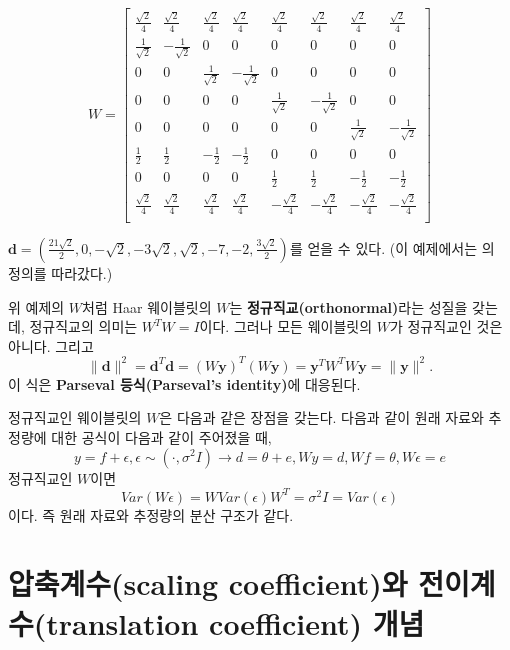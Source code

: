 \documentclass[b5paper,]{scrbook}
\theoremstyle{plain}
\theoremstyle{definition}
\numberwithin{equation}{section}
\begin{document}
\[
W =
\begin{bmatrix}
\frac{\sqrt{2}}{4} & \frac{\sqrt{2}}{4} & \frac{\sqrt{2}}{4} & \frac{\sqrt{2}}{4} & \frac{\sqrt{2}}{4} & \frac{\sqrt{2}}{4} & \frac{\sqrt{2}}{4} & \frac{\sqrt{2}}{4}\\
\frac{1}{\sqrt{2}} & -\frac{1}{\sqrt{2}} & 0 & 0 & 0 & 0 & 0 & 0\\
 0 & 0 & \frac{1}{\sqrt{2}} & -\frac{1}{\sqrt{2}} & 0 & 0 & 0 & 0\\
 0 & 0 & 0 & 0 &  \frac{1}{\sqrt{2}} & -\frac{1}{\sqrt{2}} & 0 & 0\\
 0 & 0 & 0 & 0 & 0 & 0 &  \frac{1}{\sqrt{2}} & -\frac{1}{\sqrt{2}}\\
 \frac{1}{2} & \frac{1}{2} & -\frac{1}{2} & -\frac{1}{2} & 0 & 0 & 0 & 0 \\
 0 & 0 & 0 & 0 &  \frac{1}{2} & \frac{1}{2} & -\frac{1}{2} & -\frac{1}{2}\\
 \frac{\sqrt{2}}{4} & \frac{\sqrt{2}}{4} & \frac{\sqrt{2}}{4} & \frac{\sqrt{2}}{4} & -\frac{\sqrt{2}}{4} & -\frac{\sqrt{2}}{4} & -\frac{\sqrt{2}}{4} & -\frac{\sqrt{2}}{4}\\
\end{bmatrix}
\]

\(\mathbf{d}=(\frac{21\sqrt{2}}{2},0,-\sqrt{2},-3\sqrt{2},\sqrt{2},-7,-2,\frac{3\sqrt{2}}{2})\)를 얻을 수 있다. (이 예제에서는 \citep{Nason2010}의 정의를 따라갔다.)

위 예제의 \(W\)처럼 Haar 웨이블릿의 \(W\)는 \textbf{정규직교(orthonormal)}라는 성질을 갖는데, 정규직교의 의미는 \(W^{T}W=I\)이다. 그러나 모든 웨이블릿의 \(W\)가 정규직교인 것은 아니다. 그리고
\[\| \mathbf{d} \|^{2}=\mathbf{d}^{T}\mathbf{d}=(W\mathbf{y})^{T}(W\mathbf{y})=\mathbf{y}^{T}W^{T}W\mathbf{y}=\| \mathbf{y} \|^{2}.\]
이 식은 \textbf{Parseval 등식(Parseval's identity)}에 대응된다.

정규직교인 웨이블릿의 \(W\)은 다음과 같은 장점을 갖는다. 다음과 같이 원래 자료와 추정량에 대한 공식이 다음과 같이 주어졌을 때,
\[y=f+\epsilon, \epsilon \sim (\cdot, \sigma^{2}I) \rightarrow d=\theta +e, Wy=d, Wf=\theta, W\epsilon=e\]
정규직교인 \(W\)이면
\[Var(W\epsilon)=WVar(\epsilon)W^{T}=\sigma^{2}I=Var(\epsilon)\]
이다. 즉 원래 자료와 추정량의 분산 구조가 같다.

\hypertarget{scaling-coefficient-translation-coefficient-}{%
\section{압축계수(scaling coefficient)와 전이계수(translation coefficient) 개념}\label{scaling-coefficient-translation-coefficient-}}
\end{document}
